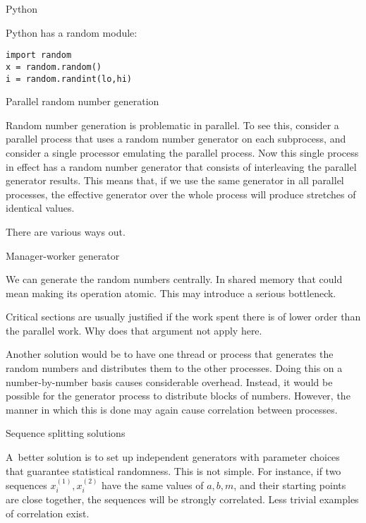 
 {Python}
\lstset{language=Python}

Python has a random module:
\lstset{language=Python}
\begin{lstlisting}
import random
x = random.random()
i = random.randint(lo,hi)
\end{lstlisting}
\lstset{language=C}

 {Parallel random number generation}
\label{sec:parallel-random}

Random number generation is problematic in parallel. To see this,
consider a parallel process that uses a random number generator on
each subprocess, and
consider a single processor emulating the parallel process. Now this
single process in effect has a random number generator that consists
of interleaving the parallel generator results. This means that, if we
use the same generator in all parallel processes, the effective
generator over the whole process will produce stretches of identical
values.

There are various ways out.

 {Manager-worker generator}

We can generate the random numbers centrally. In shared memory that could mean
making its operation atomic. This may introduce a serious bottleneck.
\begin{exercise}
  Critical sections are usually justified if the work spent there is of lower order
  than the parallel work. Why does that argument not apply here.
\end{exercise}

Another solution would be to have one thread or process that generates
the random numbers and distributes them to the other processes.
Doing this on a number-by-number basis causes considerable overhead.
Instead, it would be possible for the generator process to distribute
blocks of numbers. However, the manner in which this is done may again
cause correlation between processes.

 {Sequence splitting solutions}

A~better solution is to set up independent generators with
parameter choices that guarantee statistical randomness. This is not
simple. For instance, if two sequences $x^{(1)}_i,x^{(2)}_i$ have the
same values of $a,b,m$, and their starting points are close together,
the sequences will be strongly correlated. Less trivial examples of
correlation exist.

